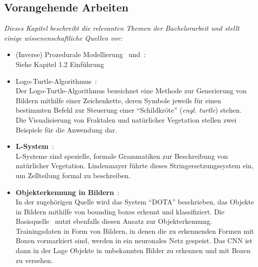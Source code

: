 \documentclass[11pt]{article}
\begin{document}
    \newpage

    \subsection{Vorangehende Arbeiten}
    \textit{Dieses Kapitel beschreibt die relevanten Themen der Bachelorarbeit und stellt einige wissenenschaftliche
    Quellen vor:}
    \begin{itemize}
        \item (Inverse) Prozedurale Modellierung~\cite{2} und~\cite{1}:\\Siehe Kapitel 1.2 Einführung
        \item Logo-Turtle-Algorithmus~\cite{3}:\\ Der Logo-Turtle-Algorithmus bezeichnet eine Methode zur Generierung
        von Bildern mithilfe einer Zeichenkette, deren Symbole jeweils für einen bestimmten Befehl zur Steuerung einer
        "`Schildkröte"' (\textit{engl. turtle}) stehen.
        Die Visualisierung von Fraktalen und natürlicher Vegetation stellen zwei Beispiele für die Anwendung dar.
        \item \textbf{L-System}~\cite{5}:\\ L-Systeme sind spezielle, formale Grammatiken zur Beschreibung von
        natürlicher Vegetation.
        Lindenmayer führte dieses Stringersetzungssystem ein, um Zellteilung formal zu beschreiben.
        \item \textbf{Objekterkennung in Bildern}~\cite{6}:\\ In der zugehörigen Quelle wird das System "`DOTA"'
        beschrieben, das Objekte in Bildern mithilfe von bounding boxes erkennt und klassifiziert. Die Basisquelle~\cite{basisquelle}
        nutzt ebenfalls diesen Ansatz zur Objekterkennung.
        Trainingsdaten in Form von Bildern, in denen die zu erkennenden Formen mit Boxen vormarkiert sind, werden in
        ein neuronales Netz gespeist.
        Das CNN ist dann in der Lage Objekte in unbekannten Bilder zu erkennen und mit Boxen zu versehen.
    \end{itemize}

    \newpage

    \begin{itemize}

    \end{itemize}
\end{document}

